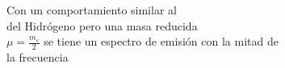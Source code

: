 \documentclass[preview]{standalone}
\begin{document}
\begin{center}
\begin{flushleft}
                      Con un comportamiento similar al \\del Hidrógeno
                      pero una masa reducida \\$\mu = \frac{m_e}{2}$ se 
                      tiene un espectro de emisión con la mitad de \\
                      la frecuencia
                      \end{flushleft}
\end{center}
\end{document}
